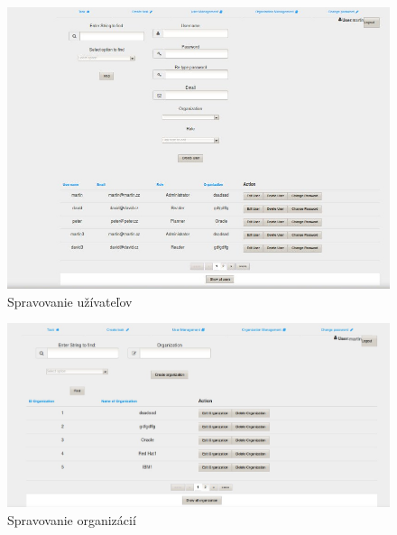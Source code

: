 {\begin{figure}[htb]
\begin{center}
\includegraphics[scale=0.4]{page3.jpg} 
\caption{Spravovanie užívateľov}


\end{center}

\end{figure}

\begin{figure}[htb]

\begin{center}

\includegraphics[scale=0.4]{page4.jpg} 
\caption{Spravovanie organizácií}


\end{center}

\end{figure}






}

